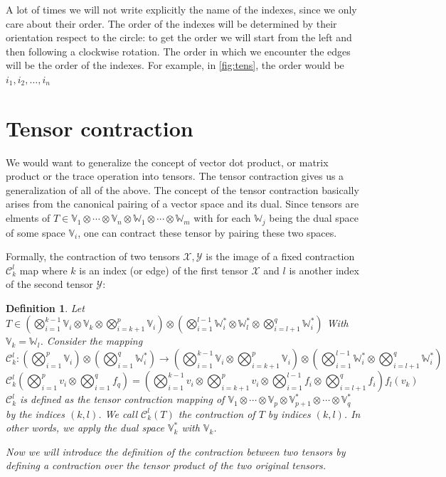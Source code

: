 \documentclass[11pt,a4paper,openright,oneside]{book}
\numberwithin{equation}{section}
\newtheorem{defn0}{Definition}[chapter]
\newenvironment{definition}{ \begin{defn0}}{\end{defn0}}
\newcommand{\figref}[1]{\cref{#1}}
\begin{document}
A lot of times we will not write explicitly the name of the indexes, since we only care about their order. The order
of the indexes will be determined by their orientation respect to the circle: to get the order we will start from the left and then
following a clockwise rotation. The order in which we encounter the edges will be the order of the indexes. For example,
in \figref{fig:tens}, the order would be $i_1, i_2, \dots, i_n$


\section{Tensor contraction}

We would want to generalize the concept of vector dot product, or matrix product or the trace operation into tensors.
The tensor contraction gives us a generalization of all of the above. The concept of the tensor contraction 
basically arises from the canonical pairing of a vector space and its dual. Since tensors are elments
of $T \in \mathbb{V}_1 \otimes \cdots \otimes \mathbb{V}_n \otimes \mathbb{W}_1 \otimes \cdots \otimes \mathbb{W}_m$ with for each
$\mathbb{W}_j$ being the dual space of some space $\mathbb{V}_i$, one can contract these tensor by pairing these two
spaces.

Formally, the contraction of two tensors $\mathcal{X}, \mathcal{Y}$ is the image of a fixed contraction $\mathcal{C}_k^l$ map where $k$ is an index (or edge) of the first tensor $\mathcal{X}$ and $l$
is another index of the second tensor $\mathcal{Y}$:

\begin{definition}
    Let $T \in \left( \bigotimes_{i=1}^{k-1} \mathbb{V}_i \otimes \mathbb{V}_k \otimes \bigotimes_{i=k+1}^{p} \mathbb{V}_i \right) \otimes 
    \left( \bigotimes_{i=1}^{l-1} \mathbb{W}_{i}^* \otimes \mathbb{W}_l^* \otimes 
    \bigotimes_{i=l+1}^q \mathbb{W}_i^* \right)$ With $\mathbb{V}_k = \mathbb{W}_l$. Consider the mapping
    $$
    \mathcal{C}_k^l: 
    \left(\bigotimes_{i=1}^{p} \mathbb{V}_i \right) \otimes \left( \bigotimes_{i=1}^{q} \mathbb{W}_i^* \right) \longrightarrow 
    \left( \bigotimes_{i=1}^{k-1} \mathbb{V}_i \otimes \bigotimes_{i=k+1}^p \mathbb{V}_i \right) \otimes \left( \bigotimes_{i=1}^{l-1} \mathbb{W}^*_i \otimes \bigotimes_{i=l+1}^q \mathbb{W}^*_i \right)
$$
$$
\mathcal{C}_k^l \left( \bigotimes\nolimits_{i=1}^p v_i \otimes \bigotimes\nolimits_{i=1}^q f_q \right) 
= \left(\bigotimes\nolimits_{i=1}^{k-1} v_i \otimes \bigotimes\nolimits_{i=k+1}^p v_{i} \otimes
    \bigotimes\nolimits_{i=1}^{l-1} f_i \otimes \bigotimes_{i=l+1}^q f_i \right) f_l(v_k)$$
$\mathcal{C}_k^l$ is defined as the tensor contraction mapping of $\mathbb{V}_1 \otimes \cdots \otimes \mathbb{V}_p \otimes \mathbb{V}_{p+1}^* \otimes
\cdots \otimes \mathbb{V}_q^*$ by the indices $(k,l)$. We call $\mathcal{C}_k^l(T)$ the contraction of $T$ by indices $(k,l)$. In other words, we apply
the dual space $\mathbb{V}_k^*$ with $\mathbb{V}_k$.

Now we will introduce the definition of the contraction between two tensors by defining a contraction over the tensor product
of the two original tensors.
\end{definition}
\end{document}
